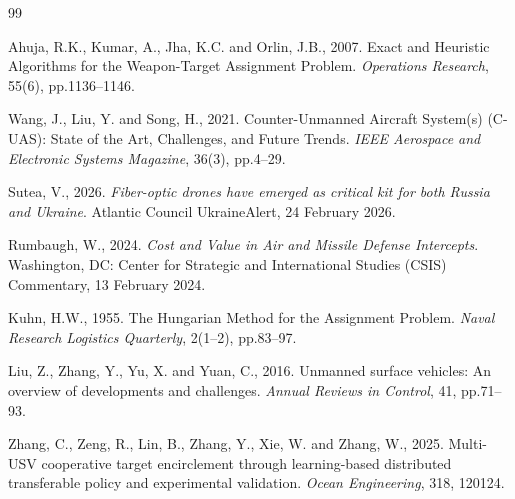 %
%
\begin{thebibliography}{99}
\footnotesize
\setlength{\itemsep}{2pt}

Ahuja, R.K., Kumar, A., Jha, K.C. and Orlin, J.B., 2007.
Exact and Heuristic Algorithms for the Weapon-Target Assignment Problem.
\textit{Operations Research}, 55(6), pp.1136--1146.

Wang, J., Liu, Y. and Song, H., 2021.
Counter-Unmanned Aircraft System(s) (C-UAS): State of the Art, Challenges, and
Future Trends.
\textit{IEEE Aerospace and Electronic Systems Magazine}, 36(3), pp.4--29.

Sutea, V., 2026.
\textit{Fiber-optic drones have emerged as critical kit for both Russia and
Ukraine}. Atlantic Council UkraineAlert, 24 February 2026.

Rumbaugh, W., 2024.
\textit{Cost and Value in Air and Missile Defense Intercepts}.
Washington, DC: Center for Strategic and International Studies (CSIS) Commentary,
13 February 2024.

Kuhn, H.W., 1955.
The Hungarian Method for the Assignment Problem.
\textit{Naval Research Logistics Quarterly}, 2(1--2), pp.83--97.

Liu, Z., Zhang, Y., Yu, X. and Yuan, C., 2016.
Unmanned surface vehicles: An overview of developments and challenges.
\textit{Annual Reviews in Control}, 41, pp.71--93.

Zhang, C., Zeng, R., Lin, B., Zhang, Y., Xie, W. and Zhang, W., 2025.
Multi-USV cooperative target encirclement through learning-based distributed
transferable policy and experimental validation.
\textit{Ocean Engineering}, 318, 120124.


\end{thebibliography}
